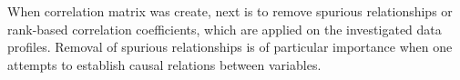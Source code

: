 When correlation matrix was create, next is to remove spurious relationships or rank-based correlation coefficients, which are applied on the investigated data profiles. Removal of spurious relationships is of particular importance when one attempts to establish causal relations between variables.






